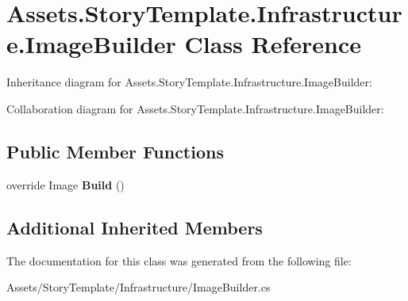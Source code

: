 \hypertarget{classAssets_1_1StoryTemplate_1_1Infrastructure_1_1ImageBuilder}{}\section{Assets.\+Story\+Template.\+Infrastructure.\+Image\+Builder Class Reference}
\label{classAssets_1_1StoryTemplate_1_1Infrastructure_1_1ImageBuilder}


Inheritance diagram for Assets.\+Story\+Template.\+Infrastructure.\+Image\+Builder\+:


Collaboration diagram for Assets.\+Story\+Template.\+Infrastructure.\+Image\+Builder\+:
\subsection*{Public Member Functions}
\begin{DoxyCompactItemize}
\item 
override Image {\bfseries Build} ()\hypertarget{classAssets_1_1StoryTemplate_1_1Infrastructure_1_1ImageBuilder_a977c8565d0b7f4fdcbc4178ab9550269}{}\label{classAssets_1_1StoryTemplate_1_1Infrastructure_1_1ImageBuilder_a977c8565d0b7f4fdcbc4178ab9550269}

\end{DoxyCompactItemize}
\subsection*{Additional Inherited Members}


The documentation for this class was generated from the following file\+:\begin{DoxyCompactItemize}
\item 
Assets/\+Story\+Template/\+Infrastructure/Image\+Builder.\+cs\end{DoxyCompactItemize}
